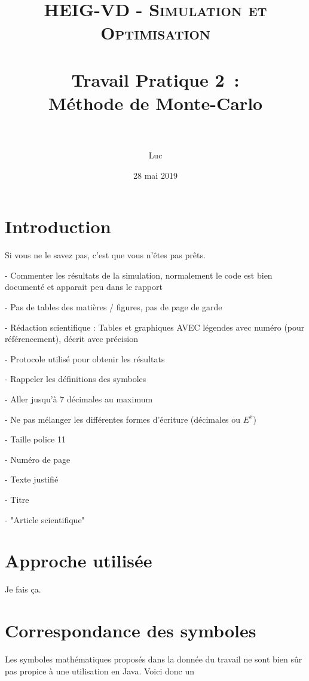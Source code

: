 \documentclass[paper=a4, fontsize=11pt]{scrartcl}
\title{
  \normalfont \normalsize
  \textsc{HEIG-VD - Simulation et Optimisation} \\[10pt]
  \horrule{1pt} \\[0.4cm] %
  \huge Travail Pratique 2~:\\Méthode de Monte-Carlo \\
  \horrule{2pt} \\[0.4cm] %
}
\author{Luc \bsc{Wachter}}
\date{28 mai 2019}
\begin{document}
\lstset{language=Java}

\maketitle

\section{Introduction}

Si vous ne le savez pas, c'est que vous n'êtes pas prêts.

- Commenter les résultats de la simulation, normalement le code est bien documenté et apparait peu dans le rapport

- Pas de tables des matières / figures, pas de page de garde

- Rédaction scientifique : Tables et graphiques AVEC légendes avec numéro (pour référencement), décrit avec précision

- Protocole utilisé pour obtenir les résultats

- Rappeler les définitions des symboles

- Aller jusqu'à 7 décimales au maximum

- Ne pas mélanger les différentes formes d'écriture (décimales ou $E^x$)

- Taille police 11

- Numéro de page

- Texte justifié

- Titre

-  "Article scientifique"

\newpage

\section{Approche utilisée}

Je fais ça.

\section{Correspondance des symboles}

Les symboles mathématiques proposés dans la donnée du travail ne sont bien sûr pas propice à une utilisation en Java. Voici donc un
\end{document}
